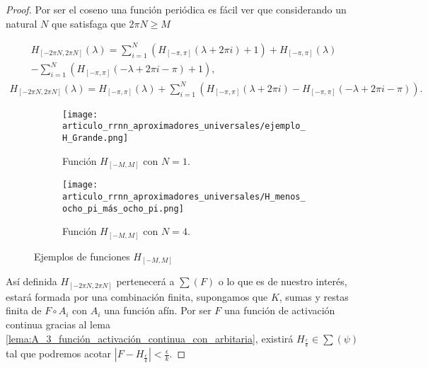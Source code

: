\begin{proof}
    Por ser el coseno una función periódica es fácil ver que 
    considerando un natural $N$ que satisfaga que $2 \pi N \geq M$
  
    \begin{equation}
    \begin{split}
        H_{[-2\pi N, 2 \pi N]} (\lambda) = 
        \sum_{i=1}^N (H_{[-\pi, \pi ]}(\lambda + 2 \pi i) +1) 
        + H_{[-\pi, \pi ]}(\lambda)  \\
        - \sum_{i=1}^N (H_{[-\pi, \pi ]}(- \lambda + 2 \pi i - \pi) +1),
    \end{split}
\end{equation}
\begin{equation}
    \begin{split}
        H_{[-2\pi N, 2 \pi N]} (\lambda) 
        =  H_{[-\pi, \pi ]}(\lambda) + 
        \sum_{i=1}^N (
            H_{[-\pi, \pi ]}(\lambda + 2 \pi i)
            - 
            H_{[-\pi, \pi ]}(- \lambda + 2 \pi i - \pi)
        ) .         
    \end{split}
    \end{equation}

      \begin{figure}[h]
        \centering
        \begin{subfigure}[b]{0.45\textwidth}
            \centering
            \texttt{[image: articulo\_rrnn\_aproximadores\_universales/ejemplo\_H\_Grande.png]}
            \caption{Función $H_{[-M, M]}$ con $N=1$.}
            \label{fig:H_con_M}
        \end{subfigure}
        \hfill
        \begin{subfigure}[b]{0.45\textwidth}
            \centering
            \texttt{[image: articulo\_rrnn\_aproximadores\_universales/H\_menos\_ocho\_pi\_más\_ocho\_pi.png]}
            \caption{Función $H_{[-M, M]}$ con $N=4$. }
        \end{subfigure}
        \hfill
        \caption{Ejemplos de funciones $H_{[-M, M]}$}
    \end{figure}

    
    Así definida $H_{[-2\pi N, 2 \pi N]}$
    pertenecerá a $\sum(F)$ o lo que es de nuestro interés, estará 
    formada por una combinación finita, supongamos que $K$, 
    sumas y restas finita de $F \circ A_i$ con $A_i$ una función afín. 
    Por ser $F$ una función de activación continua gracias al
    lema \ref{lema:A_3_función_activación_continua_con_arbitaria}, 
    existirá $H_{ \frac{\epsilon}{k}} \in \sum(\psi)$ tal que 
    podremos acotar $|F - H_{ \frac{\epsilon}{k}} | < \frac{\epsilon}{k}$.


\end{proof}
